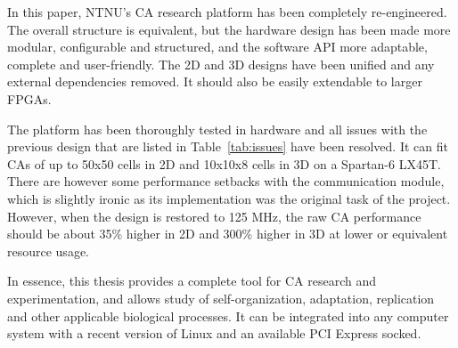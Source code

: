 In this paper, NTNU's CA research platform has been completely re-engineered.
The overall structure is equivalent, but the hardware design has been made more modular, configurable and structured, and the software API more adaptable, complete and user-friendly.
The 2D and 3D designs have been unified and any external dependencies removed.
It should also be easily extendable to larger FPGAs.

The platform has been thoroughly tested in hardware and all issues with the previous design that are listed in Table~\ref{tab:issues} have been resolved.
It can fit CAs of up to 50x50 cells in 2D and 10x10x8 cells in 3D on a Spartan-6 LX45T.
There are however some performance setbacks with the communication module, which is slightly ironic as its implementation was the original task of the project.
However, when the design is restored to 125 MHz, the raw CA performance should be about 35\% higher in 2D and 300\% higher in 3D at lower or equivalent resource usage.

In essence, this thesis provides a complete tool for CA research and experimentation, and allows study of self-organization, adaptation, replication and other applicable biological processes.
It can be integrated into any computer system with a recent version of Linux and an available PCI Express socked.
